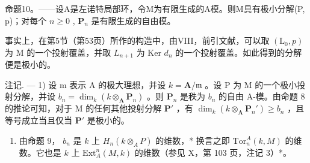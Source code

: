 命题10。——设A是左诺特局部环，令M为有限生成的A模。则M具有极小分解(P, p)；对每个 \(n \geqslant 0\) , \(\mathbf{P}_{n}\) 是有限生成的自由模。

事实上，在第5节（第53页）所作的构造中，由VIII，前引文献，可以取 \((\mathrm{L}_{0}, p)\) 为 M 的一个投射覆盖，并取 \(L_{n+1}\) 为 Ker \(d_{n}\) 的一个投射覆盖。如此得到的分解便是极小的。

注记. --- 1) 设 m 表示 A 的极大理想，并设 \(k = \mathbf{A}/\mathfrak{m}\) 。设 P 为 M 的一个极小投射分解，并设 \(b_{n} = \dim_{k}(k \otimes_{\mathbf{A}} \mathbf{P}_{n})\) 。则 \(\mathbf{P}_{n}\) 是秩为 \(b_{n}\) 的自由 A-模。由命题 8 的推论可知，对于 M 的任何其他投射分解 \(\mathbf{P}'\) ，有 \(\dim_{k}(k \otimes_{\mathbf{A}} \mathbf{P}_{n}') \geqslant b_{n}\) ，且等号成立当且仅当 \(\mathbf{P}'\) 是极小的。

\begin{enumerate}
\def\labelenumi{\arabic{enumi})}
\setcounter{enumi}{1}
\tightlist
\item
  由命题 9， \(b_n\) 是 \(k\) 上 \(H_n(k \otimes_A P)\) 的维数，* 换言之即 \(\text{Tor}_n^A(k, M)\) 的维数。它也是 \(k\) 上 \(\text{Ext}_A^n(M, k)\) 的维数（参见 X，第 103 页，注记 3）*。
\end{enumerate}


